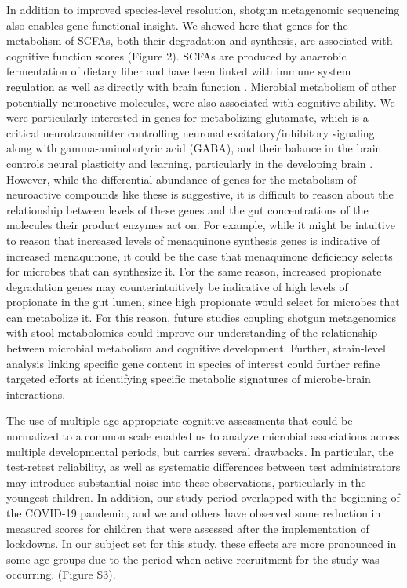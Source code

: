 \documentclass{article}
\begin{document}
In addition to improved species-level resolution, shotgun metagenomic
sequencing also enables gene-functional insight. We showed here that
genes for the metabolism of SCFAs, both their degradation and synthesis,
are associated with cognitive function scores (Figure 2). 
SCFAs are produced by anaerobic fermentation of dietary fiber
and have been linked with immune system regulation as well as directly
with brain function \cite{dalileRoleShortchainFatty2019}.
Microbial metabolism of other potentially neuroactive molecules,
were also associated with cognitive ability. We were particularly interested
in genes for metabolizing glutamate, which is a
critical neurotransmitter controlling neuronal excitatory/inhibitory
signaling along with gamma-aminobutyric acid (GABA), and their balance
in the brain controls neural plasticity and learning, particularly in
the developing brain \cite{cohenkadoshLinkingGABAGlutamate2015,palomo-buitragoGlutamateInteractionsObesity2019}.
However, while the
differential abundance of genes for the metabolism of neuroactive
compounds like these is suggestive, it is difficult to reason about the
relationship between levels of these genes and the gut concentrations of
the molecules their product enzymes act on. For example, while it might
be intuitive to reason that increased levels of menaquinone synthesis
genes is indicative of increased menaquinone, it could be the case that
menaquinone deficiency selects for microbes that can synthesize it. For
the same reason, increased propionate degradation genes may
counterintuitively be indicative of high levels of propionate in the gut
lumen, since high propionate would select for microbes that can
metabolize it. For this reason, future studies coupling shotgun
metagenomics with stool metabolomics could improve our understanding of
the relationship between microbial metabolism and cognitive development.
Further, strain-level analysis linking specific gene content in species
of interest could further refine targeted efforts at identifying
specific metabolic signatures of microbe-brain interactions.

The use of multiple age-appropriate cognitive assessments that could be
normalized to a common scale enabled us to analyze microbial
associations across multiple developmental periods, but carries several
drawbacks. In particular, the test-retest reliability, as well as
systematic differences between test administrators may introduce
substantial noise into these observations, particularly in the youngest
children. In addition, our study period overlapped with the beginning of
the COVID-19 pandemic, and we and others have observed some reduction in
measured scores for children that were assessed after the implementation
of lockdowns. In our subject set for this study, these effects are more
pronounced in some age groups due to the period when active recruitment for
the study was occurring.
\cite{blackwellYouthWellbeingCOVID192022,deoniImpactCOVID19Pandemic2021}
(Figure S3).
\end{document}
